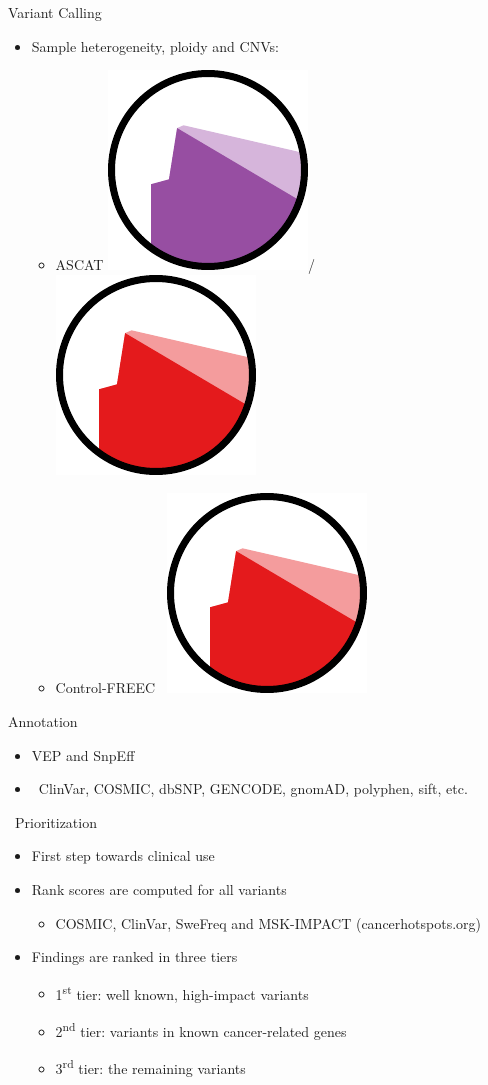 \documentclass[usepdftitle=false]{beamer}
\newcommand{\ts}{\textsuperscript}
\begin{document}
\begin{frame}{Variant Calling}
\begin{itemize}
\begin{itemize}
		\end{itemize}
		\item Sample heterogeneity, ploidy and CNVs:
		\pause
		\begin{itemize}
			\item ASCAT  \includegraphics[height=.35cm]{pictures/Sarek_exome-logo}/\includegraphics[height=.35cm]{pictures/Sarek_somatic-logo}
			\item Control-FREEC \faWrench\  \includegraphics[height=.35cm]{pictures/Sarek_somatic-logo}
		\end{itemize}
	\end{itemize}
\end{frame}

\begin{frame}{Annotation}
	\begin{itemize}
		\item VEP and SnpEff
		\item \faDatabase\ ClinVar, COSMIC, dbSNP, GENCODE, gnomAD, polyphen, sift, etc.
	\end{itemize}
\end{frame}

\begin{frame}{\faWrench\ Prioritization}
	\begin{itemize}
		\item	First step towards clinical use
		\pause
		\item	Rank scores are computed for all variants
		\begin{itemize}
			\item	COSMIC, ClinVar, SweFreq and MSK-IMPACT (cancerhotspots.org)
		\end{itemize}
		\pause
		\item	Findings are ranked in three tiers
		\begin{itemize}
			\item	1\ts{st} tier: well known, high-impact variants
			\item	2\ts{nd} tier: variants in known cancer-related genes
			\item	3\ts{rd} tier: the remaining variants
		\end{itemize}
	\end{itemize}
\end{frame}
\end{document}
